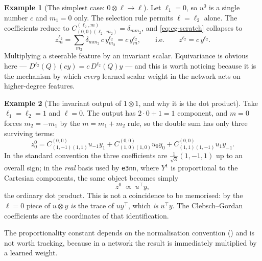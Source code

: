 \documentclass[11pt,a4paper]{report}
\theoremstyle{definition}
\newtheorem{example}[example]{Example}
\theoremstyle{remark}
\begin{document}
\begin{example}[The simplest case: $0\otimes\ell\to\ell$]
\label{ex:cg-scalar}
Let $\ell_1=0$, so $u^{0}$ is a single number $c$ and $m_1=0$ only. The
selection rule permits $\ell=\ell_2$ alone. The coefficients reduce to
$C^{(\ell_2,m)}_{(0,0)(\ell_2,m_2)}=\delta_{m m_2}$, and
\eqref{eq:cg-scratch} collapses to
\[
z^{\ell_2}_m = \sum_{m_2}\delta_{mm_2}\,c\,y^{\ell_2}_{m_2} = c\,y^{\ell_2}_m ,
\qquad\text{i.e.}\qquad z^{\ell_2}=c\,y^{\ell_2} .
\]
Multiplying a steerable feature by an invariant scalar. Equivariance is
obvious here --- $D^{\ell_2}(Q)(cy)=c\,D^{\ell_2}(Q)y$ --- and this is worth
noticing because it is the mechanism by which \emph{every} learned scalar
weight in the network acts on higher-degree features.
\end{example}

\begin{example}[The invariant output of $1\otimes1$, and why it is the dot product]
\label{ex:cg-dot}
Take $\ell_1=\ell_2=1$ and $\ell=0$. The output has $2\cdot0+1=1$ component,
and $m=0$ forces $m_2=-m_1$ by the $m=m_1+m_2$ rule, so the double sum has
only three surviving terms:
\[
z^{0}_0
=
C^{(0,0)}_{(1,-1)(1,1)}u_{-1}y_{1}
+C^{(0,0)}_{(1,0)(1,0)}u_{0}y_{0}
+C^{(0,0)}_{(1,1)(1,-1)}u_{1}y_{-1} .
\]
In the standard convention the three coefficients are
$\tfrac1{\sqrt3}(1,-1,1)$ up to an overall sign; in the \emph{real} basis
used by \texttt{e3nn}, where $Y^1$ is proportional to the Cartesian
components, the same object becomes simply
\[
z^0 \;\propto\; u^\top y ,
\]
the ordinary dot product. This is not a coincidence to be memorised: by
 the $\ell=0$ piece of $u\otimes y$ \emph{is} the
trace of $uy^\top$, which \emph{is} $u^\top y$. The Clebsch--Gordan
coefficients are the coordinates of that identification.

The proportionality constant depends on the normalisation convention
() and is not worth tracking, because in a
network the result is immediately multiplied by a learned weight.
\end{example}
\end{document}
